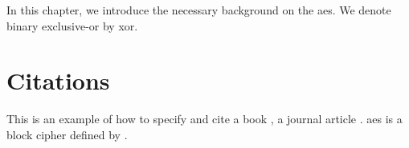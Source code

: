 
In this chapter, we introduce the necessary background on the \gls{aes}.
We denote binary exclusive-or by \gls{xor}.

\section{Citations}


\label{sec:bib}
This is an example of how to specify and cite
a book \cite{AESbook},
a journal article \cite{bstjShannon49}.
\Gls{aes} is a block cipher defined by \textcite{AESbook}.
